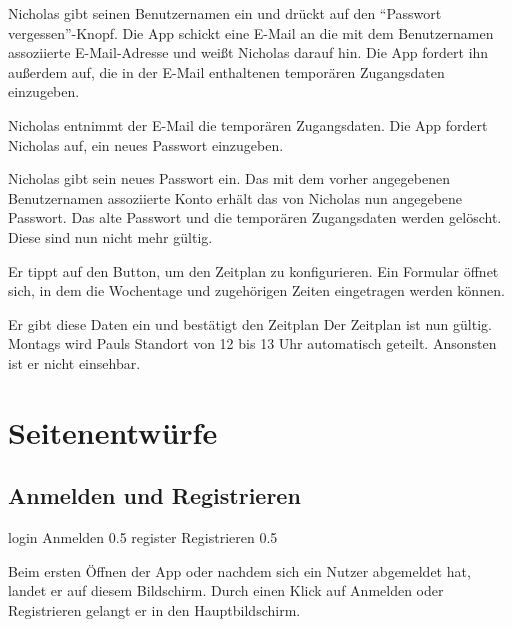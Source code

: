 \documentclass[parskip=full,11pt]{scrartcl}
\begin{document}
{Nicholas gibt seinen Benutzernamen ein und drückt auf den
\enquote{Passwort vergessen}-Knopf.}
{Die App schickt eine E-Mail an die mit dem Benutzernamen assoziierte
E-Mail-Adresse und weißt Nicholas darauf hin.
Die App fordert ihn außerdem auf, die in der E-Mail enthaltenen temporären
Zugangsdaten einzugeben.}

{Nicholas entnimmt der E-Mail die temporären Zugangsdaten.}
{Die App fordert Nicholas auf, ein neues Passwort einzugeben.}

{Nicholas gibt sein neues Passwort ein.}
{Das mit dem vorher angegebenen Benutzernamen assoziierte Konto erhält das von
Nicholas nun angegebene Passwort.
Das alte Passwort und die temporären Zugangsdaten werden gelöscht.
Diese sind nun nicht mehr gültig.}

{Er tippt auf den Button, um den Zeitplan zu konfigurieren.}
{Ein Formular öffnet sich, in dem die Wochentage und zugehörigen Zeiten eingetragen werden können.}

{Er gibt diese Daten ein und bestätigt den Zeitplan}
{Der Zeitplan ist nun gültig. Montags wird Pauls Standort von 12 bis 13 Uhr automatisch geteilt. Ansonsten ist er nicht einsehbar.}


\pagebreak
\appendix

\section{Seitenentwürfe}

\subsection{Anmelden und Registrieren}
{login}
{Anmelden}
{0.5}
{register}
{Registrieren}
{0.5}

Beim ersten Öffnen der App oder nachdem sich ein Nutzer abgemeldet hat, landet er auf diesem Bildschirm.
Durch einen Klick auf Anmelden oder Registrieren gelangt er in den Hauptbildschirm.
\end{document}
